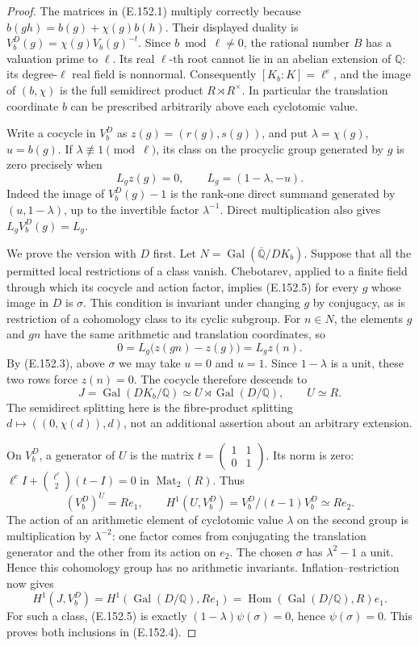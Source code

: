 \begin{proof}
The matrices in (E.152.1) multiply correctly because
\(b(gh)=b(g)+\chi(g)b(h)\). Their displayed duality is
\(V_b^D(g)=\chi(g)V_b(g)^{-t}\).
Since \(b\bmod\ell\ne0\), the rational number \(B\) has a
valuation prime to \(\ell\). Its real \(\ell\)-th root cannot
lie in an abelian extension of \(\mathbb Q\): its degree-\(\ell\)
real field is nonnormal. Consequently
\([K_b:K]=\ell^e\), and the image of \((b,\chi)\) is the full
semidirect product \(R\rtimes R^\times\).
In particular the translation coordinate \(b\) can be prescribed
arbitrarily above each cyclotomic value.

Write a cocycle in \(V_b^D\) as \(z(g)=(r(g),s(g))\), and put
\(\lambda=\chi(g)\), \(u=b(g)\). If
\(\lambda\not\equiv1\pmod\ell\), its class on the procyclic
group generated by \(g\) is zero precisely when
\[
 L_gz(g)=0,
 \qquad L_g=(1-\lambda,-u).
 \tag{E.152.5}
\]
Indeed the image of \(V_b^D(g)-1\) is the rank-one direct
summand generated by \((u,1-\lambda)\), up to the invertible
factor \(\lambda^{-1}\). Direct multiplication also gives
\(L_gV_b^D(g)=L_g\).

We prove the version with \(D\) first. Let
\(N=\operatorname{Gal}(\overline{\mathbb Q}/DK_b)\).
Suppose that all the permitted local restrictions of a class vanish.
Chebotarev, applied to a finite field through which its cocycle and
action factor, implies (E.152.5) for every \(g\) whose image in
\(D\) is \(\sigma\). This condition is invariant under changing
\(g\) by conjugacy, as is restriction of a cohomology class to
its cyclic subgroup. For \(n\in N\), the elements \(g\) and
\(gn\) have the same arithmetic and translation coordinates, so
\[
 0=L_g\bigl(z(gn)-z(g)\bigr)=L_gz(n).
 \tag{E.152.6}
\]
By (E.152.3), above \(\sigma\) we may take \(u=0\) and
\(u=1\). Since \(1-\lambda\) is a unit, these two rows force
\(z(n)=0\). The cocycle therefore descends to
\[
 J=\operatorname{Gal}(DK_b/\mathbb Q)
          \simeq U\rtimes\operatorname{Gal}(D/\mathbb Q),
 \qquad U\simeq R.
 \tag{E.152.7}
\]
The semidirect splitting here is the fibre-product splitting
\(d\mapsto((0,\chi(d)),d)\), not an additional assertion about
an arbitrary extension.

On \(V_b^D\), a generator of \(U\) is the matrix
\(t=\left(\begin{smallmatrix}1&1\\0&1\end{smallmatrix}\right)\).
Its norm is zero: \(\ell^e I+\binom{\ell^e}{2}(t-I)=0\) in
\(\operatorname{Mat}_2(R)\). Thus
\[
 (V_b^D)^U=Re_1,
 \qquad H^1(U,V_b^D)=V_b^D/(t-1)V_b^D\simeq Re_2.
 \tag{E.152.8}
\]
The action of an arithmetic element of cyclotomic value \(\lambda\)
on the second group is multiplication by \(\lambda^{-2}\):
one factor comes from conjugating the translation generator and
the other from its action on \(e_2\). The chosen \(\sigma\)
has \(\lambda^2-1\) a unit. Hence this cohomology group has no
arithmetic invariants. Inflation--restriction now gives
\[
 H^1(J,V_b^D)=H^1(\operatorname{Gal}(D/\mathbb Q),Re_1)
            =\operatorname{Hom}(\operatorname{Gal}(D/\mathbb Q),R)e_1.
 \tag{E.152.9}
\]
For such a class, (E.152.5) is exactly
\((1-\lambda)\psi(\sigma)=0\), hence \(\psi(\sigma)=0\).
This proves both inclusions in (E.152.4).


\end{proof}
